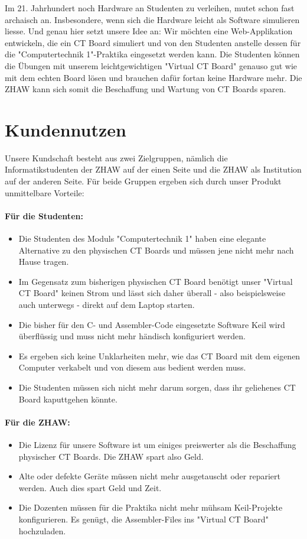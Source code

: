 \documentclass[10pt]{article}
\begin{document}
Im 21. Jahrhundert noch Hardware an Studenten zu verleihen, mutet schon fast archaisch an. Insbesondere, wenn sich die Hardware leicht als Software simulieren liesse. Und genau hier setzt unsere Idee an: Wir möchten eine Web-Applikation entwickeln, die ein CT Board simuliert und von den Studenten anstelle dessen für die "Computertechnik 1"-Praktika eingesetzt werden kann. Die Studenten können die Übungen mit unserem leichtgewichtigen "Virtual CT Board" genauso gut wie mit dem echten Board lösen und brauchen dafür fortan keine Hardware mehr. Die ZHAW kann sich somit die Beschaffung und Wartung von CT Boards sparen.

\section{Kundennutzen}

Unsere Kundschaft besteht aus zwei Zielgruppen, nämlich die Informatikstudenten der ZHAW auf der einen Seite und die ZHAW als Institution auf der anderen Seite. Für beide Gruppen ergeben sich durch unser Produkt unmittelbare Vorteile:

\paragraph{Für die Studenten:}
\begin{itemize}
\item Die Studenten des Moduls "Computertechnik 1" haben eine elegante Alternative zu den physischen CT Boards und müssen jene nicht mehr nach Hause tragen.
\item Im Gegensatz zum bisherigen physischen CT Board benötigt unser "Virtual CT Board" keinen Strom und lässt sich daher überall - also beispielsweise auch unterwegs - direkt auf dem Laptop starten.
\item Die bisher für den C- und Assembler-Code eingesetzte Software Keil wird überflüssig und muss nicht mehr händisch konfiguriert werden.
\item Es ergeben sich keine Unklarheiten mehr, wie das CT Board mit dem eigenen Computer verkabelt und von diesem aus bedient werden muss.
\item Die Studenten müssen sich nicht mehr darum sorgen, dass ihr geliehenes CT Board kaputtgehen könnte.
\end{itemize}

\paragraph{Für die ZHAW:}
\begin{itemize}
\item Die Lizenz für unsere Software ist um einiges preiswerter als die Beschaffung physischer CT Boards. Die ZHAW spart also Geld.
\item Alte oder defekte Geräte müssen nicht mehr ausgetauscht oder repariert werden. Auch dies spart Geld und Zeit.
\item Die Dozenten müssen für die Praktika nicht mehr mühsam Keil-Projekte konfigurieren. Es genügt, die Assembler-Files ins "Virtual CT Board" hochzuladen.
\end{itemize}
\end{document}
